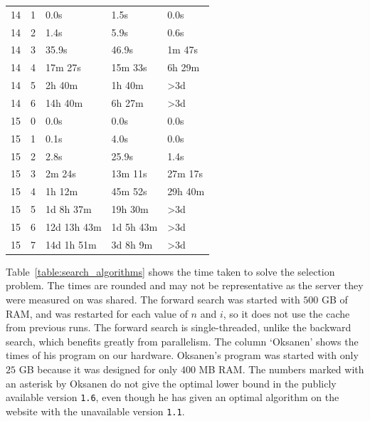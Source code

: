 \documentclass[10pt,journal,compsoc]{IEEEtran}
\begin{document}
\begin{table}[!t]
\begin{tabular}{c|c|l|l|l}
    14         & 1          & 0.0s                    & 1.5s                     & 0.0s             \\
    14         & 2          & 1.4s                    & 5.9s                     & 0.6s             \\
    14         & 3          & 35.9s                   & 46.9s                    & 1m 47s           \\
    14         & 4          & 17m 27s                 & 15m 33s                  & 6h 29m           \\
    14         & 5          & 2h 40m                  & 1h 40m                   & >3d              \\
    14         & 6          & 14h 40m                 & 6h 27m                   & >3d              \\
    \hline
    15         & 0          & 0.0s                    & 0.0s                     & 0.0s             \\
    15         & 1          & 0.1s                    & 4.0s                     & 0.0s             \\
    15         & 2          & 2.8s                    & 25.9s                    & 1.4s             \\
    15         & 3          & 2m 24s                  & 13m 11s                  & 27m 17s          \\
    15         & 4          & 1h 12m                  & 45m 52s                  & 29h 40m          \\
    15         & 5          & 1d 8h 37m               & 19h 30m                  & >3d              \\
    15         & 6          & 12d 13h 43m             & 1d 5h 43m                & >3d              \\
    15         & 7          & 14d 1h 51m              & 3d 8h 9m                 & >3d              \\
  \end{tabular}
\end{table}

Table~\ref{table:search_algorithms} shows the time taken to solve the selection problem.
The times are rounded and may not be representative as the server they were measured on was shared.
The forward search was started with $500$ GB of RAM, and was restarted for each value of $n$ and $i$, so it does not use the cache from previous runs.
The forward search is single-threaded, unlike the backward search, which benefits greatly from parallelism.
The column `Oksanen' shows the times of his program \cite{Oksanen} on our hardware.
Oksanen's program was started with only $25$ GB because it was designed for only $400$ MB RAM.
The numbers marked with an asterisk by Oksanen do not give the optimal lower bound in the publicly available version \texttt{1.6}, even though he has given an optimal algorithm on the website with the unavailable version \texttt{1.1}.
\end{document}
